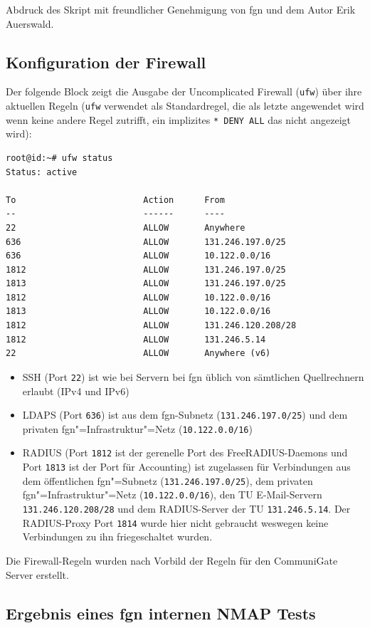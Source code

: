 \documentclass[11pt,a4paper,titlepage=firstiscover,headsepline,bibtotoc]{scrartcl} %
\begin{document}
Abdruck des Skript mit freundlicher Genehmigung von fgn und dem Autor Erik Auerswald.

\newpage
\subsection{Konfiguration der Firewall}
Der folgende Block zeigt die Ausgabe der Uncomplicated Firewall (\texttt{ufw}) über ihre aktuellen Regeln (\texttt{ufw} verwendet als Standardregel, die als letzte angewendet wird wenn keine andere Regel zutrifft, ein implizites \texttt{* DENY ALL} das nicht angezeigt wird):
\begin{lstlisting}
root@id:~# ufw status
Status: active

To                         Action      From
--                         ------      ----
22                         ALLOW       Anywhere
636                        ALLOW       131.246.197.0/25
636                        ALLOW       10.122.0.0/16
1812                       ALLOW       131.246.197.0/25
1813                       ALLOW       131.246.197.0/25
1812                       ALLOW       10.122.0.0/16
1813                       ALLOW       10.122.0.0/16
1812                       ALLOW       131.246.120.208/28
1812                       ALLOW       131.246.5.14
22                         ALLOW       Anywhere (v6)
\end{lstlisting}
\begin{itemize}
\item SSH (Port \texttt{22}) ist wie bei Servern bei fgn üblich von sämtlichen Quellrechnern erlaubt (IPv4 und IPv6)
\item LDAPS (Port \texttt{636}) ist aus dem fgn-Subnetz (\texttt{131.246.197.0/25}) und dem privaten fgn"=Infrastruktur"=Netz (\texttt{10.122.0.0/16})
\item RADIUS (Port \texttt{1812} ist der gerenelle Port des FreeRADIUS-Daemons und Port \texttt{1813} ist der Port für Accounting) ist zugelassen für Verbindungen aus dem öffentlichen fgn"=Subnetz (\texttt{131.246.197.0/25}), dem privaten fgn"=Infrastruktur"=Netz (\texttt{10.122.0.0/16}), den TU E-Mail-Servern \texttt{131.246.120.208/28} und dem RADIUS-Server der TU \texttt{131.246.5.14}. Der RADIUS-Proxy Port \texttt{1814} wurde hier nicht gebraucht weswegen keine Verbindungen zu ihn friegeschaltet wurden.
\end{itemize}
Die Firewall-Regeln wurden nach Vorbild der Regeln für den CommuniGate Server erstellt.


\newpage
\subsection{Ergebnis eines fgn internen NMAP Tests}\label{sec:NMAP-Test-int}

\end{document}
